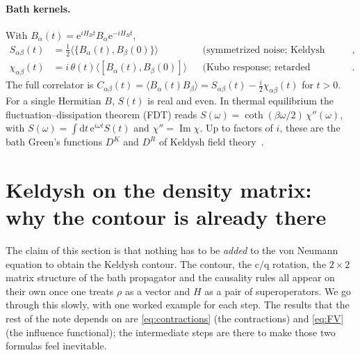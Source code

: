 \documentclass[11pt]{article}
\newcommand{\ee}{\mathrm{e}}
\newcommand{\dd}{\mathrm{d}}
\newcommand{\cl}{\mathrm{c}}
\newcommand{\qu}{\mathrm{q}}
\newcommand{\avg}[1]{\langle#1\rangle}
\begin{document}
\paragraph{Bath kernels.}
With $B_\alpha(t)=\ee^{iH_Bt}B_\alpha\ee^{-iH_Bt}$,
\begin{align}
  S_{\alpha\beta}(t)&=\tfrac12\avg{\{B_\alpha(t),B_\beta(0)\}}
  &&\text{(symmetrized noise; Keldysh component)},\\
  \chi_{\alpha\beta}(t)&=i\,\theta(t)\avg{[B_\alpha(t),B_\beta(0)]}
  &&\text{(Kubo response; retarded component)}.
\end{align}
The full correlator is $C_{\alpha\beta}(t)=\avg{B_\alpha(t)B_\beta}=S_{\alpha\beta}(t)-\tfrac{i}{2}\chi_{\alpha\beta}(t)$
for $t>0$. For a single Hermitian $B$, $S(t)$ is real and even. In thermal equilibrium the
fluctuation--dissipation theorem (FDT) reads $S(\omega)=\coth(\beta\omega/2)\,\chi''(\omega)$, with
$S(\omega)=\int\!\dd t\,\ee^{i\omega t}S(t)$ and $\chi''=\operatorname{Im}\chi$. Up to factors of $i$, these are the bath
Green's functions $D^K$ and $D^R$ of Keldysh field theory~\cite{Kamenev2011,KamenevLevchenko2009}.

\section{Keldysh on the density matrix: why the contour is already there}
\label{sec:keldysh-rho}

The claim of this section is that nothing has to be \emph{added} to the von Neumann
equation to obtain the Keldysh contour. The contour, the $\cl/\qu$ rotation, the
$2\times2$ matrix structure of the bath propagator and the causality rules all appear
on their own once one treats $\rho$ as a vector and $H$ as a pair of superoperators.
We go through this slowly, with one worked example for each step. The results that the
rest of the note depends on are \cref{eq:contractions} (the contractions) and
\cref{eq:FV} (the influence functional); the intermediate steps are there to make
those two formulas feel inevitable.
\end{document}
